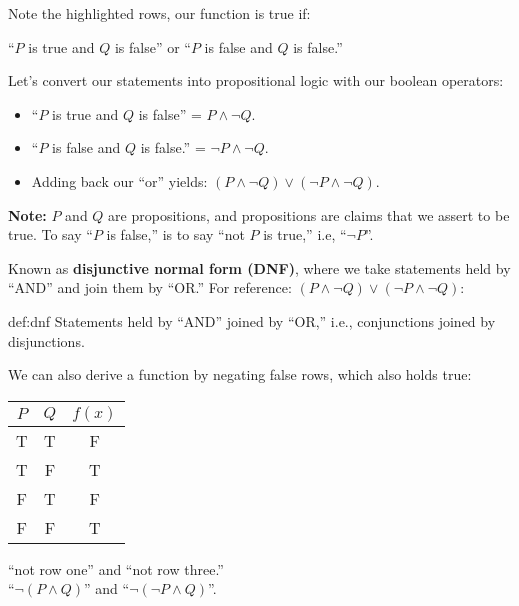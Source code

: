 \noindent
Note the highlighted rows, our function is true if:
\begin{center}
    \large
    ``$P$ is true and $Q$ is false'' or ``$P$ is false and $Q$ is false.''\\
\end{center}

\noindent
Let's convert our statements into propositional logic with our boolean operators:
\begin{itemize}
    \item ``$P$ is true and $Q$ is false'' = $P \land \neg Q$.
    \item ``$P$ is false and $Q$ is false.'' = $\neg P \land \neg Q$.
    \item Adding back our ``or'' yields: $(P \land \neg Q) \lor (\neg P \land \neg Q)$.
\end{itemize}

\begin {Note}
\textbf{Note:} $P$ and $Q$ are propositions, and propositions are claims that we assert to be true.
To say ``$P$ is false,'' is to say ``not $P$ is true,'' i.e, ``$\neg P$''.
\end{Note}

\newpage

\noindent
Known as \textbf{disjunctive normal form (DNF)}, where we take statements held by
``AND'' and join them by ``OR.'' For reference: $(P \land \neg Q) \lor (\neg P \land \neg Q)$:

\begin{Def}{def:dnf}
    Statements held by ``AND'' joined by ``OR,'' i.e., conjunctions joined by disjunctions.
\end{Def}

\noindent
We can also derive a function by negating false rows, which also holds true:\\
\begin{center}
    \begin{tabular}{|c|c|c|}
        \hline
        \rowcolor{OliveGreen!10}
        $P$ & $Q$ & $f(x)$ \\
        \hline
        \rowcolor{purple!10}
        T   & T   & F      \\
        T   & F   & T      \\
        \rowcolor{purple!10}
        F   & T   & F      \\
        F   & F   & T      \\
        \hline
    \end{tabular}
\end{center}
\begin{center}
    \large
    ``not row one'' and ``not row three.''\\
    ``$\neg(P \land Q)$'' and ``$\neg(\neg P \land Q)$''.
\end{center}

